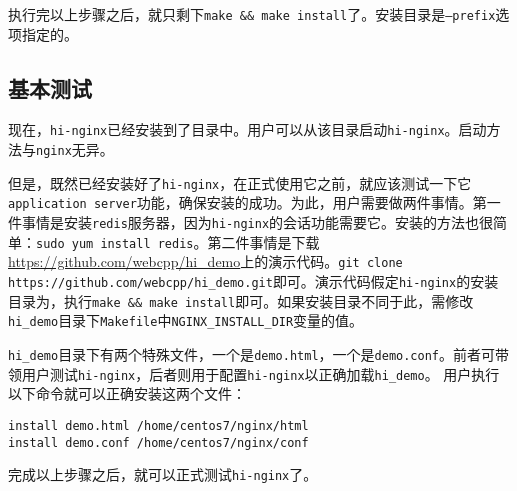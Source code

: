 执行完以上步骤之后，就只剩下\texttt{make \&\& make install}了。安装目录是\texttt{--prefix}选项指定的。


\subsection{基本测试}
现在，\texttt{hi-nginx}已经安装到了目录中。用户可以从该目录启动\texttt{hi-nginx}。启动方法与\texttt{nginx}无异。

但是，既然已经安装好了\texttt{hi-nginx}，在正式使用它之前，就应该测试一下它\texttt{application server}功能，确保安装的成功。为此，用户需要做两件事情。第一件事情是安装\texttt{redis}服务器，因为\texttt{hi-nginx}的会话功能需要它。安装的方法也很简单：\texttt{sudo yum install redis}。第二件事情是下载\url{https://github.com/webcpp/hi_demo}上的演示代码。\texttt{git clone https://github.com/webcpp/hi_demo.git}即可。演示代码假定\texttt{hi-nginx}的安装目录为，执行\texttt{make \&\& make install}即可。如果安装目录不同于此，需修改\texttt{hi_demo}目录下\texttt{Makefile}中\texttt{NGINX_INSTALL_DIR}变量的值。

\texttt{hi_demo}目录下有两个特殊文件，一个是\texttt{demo.html}，一个是\texttt{demo.conf}。前者可带领用户测试\texttt{hi-nginx}，后者则用于配置\texttt{hi-nginx}以正确加载\texttt{hi_demo}。
用户执行以下命令就可以正确安装这两个文件：
\begin{lstlisting}
install demo.html /home/centos7/nginx/html
install demo.conf /home/centos7/nginx/conf
\end{lstlisting}
完成以上步骤之后，就可以正式测试\texttt{hi-nginx}了。

